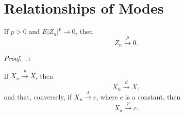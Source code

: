 \section{Relationships of Modes}

\begin{lemma}
	If $p>0$ and $E\left|Z_{n}\right|^{p}\rightarrow 0$, then
	\begin{equation}
		Z_{n}\stackrel{p}{\rightarrow}0.
	\end{equation}
\end{lemma}

\begin{proof}

\end{proof}

\begin{theorem}
	If $X_{n}\stackrel{p}{\rightarrow}X$, then
	\begin{equation}
		X_{n}\stackrel{d}{\rightarrow}X,
	\end{equation}
	and that, conversely, if $X_{n}\stackrel{d}{\rightarrow}c$, where $c$ is a constant, then
	\begin{equation}
		X_{n}\stackrel{p}{\rightarrow}c.
	\end{equation}
\end{theorem}

